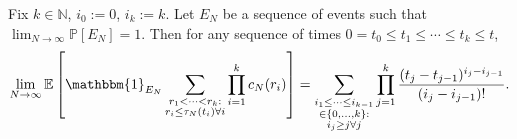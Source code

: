 \documentclass{article}
\newcommand{\Prob}{\mathbb{P}}
\newcommand{\E}{\mathbb{E}}
\newcommand{\1}[1]{\mathbbm{1}_{#1}}
\begin{document}
\begin{lemma}\label{thm:induction_sumprodcN}
Fix $k \in \mathbb{N}$, $i_0:=0$, $i_k:=k$. 
Let $E_N$ be a sequence of events such that 
$\lim_{N\to\infty} \Prob[E_N] =1$. 
Then for any sequence of times 
$0 = t_0 \leq t_1 \leq \cdots \leq t_k \leq t$,
\begin{equation}\label{eq:032}
\lim_{N\to\infty} \E \left[ \1{E_N} 
        \sum_{\substack{r_1<\dots<r_k :\\ r_i\leq \tau_N(t_i) \forall i}}
        \prod_{i=1}^k c_N(r_i) \right] 
= \sum_{\substack{i_1\leq \dots\leq i_{k-1}\\ \in \{0,\dots,k\} :
        \\ i_j \geq j \forall j}} 
        \prod_{j=1}^k \frac{(t_j - t_{j-1})^{i_j - i_{j-1}}}{(i_j - i_{j-1})! } .
\end{equation}
\end{lemma}
\end{document}
